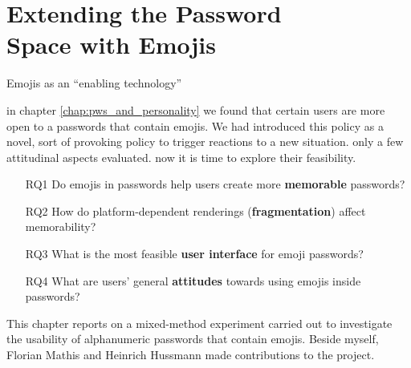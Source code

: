 \chapter[Extending the Password Space with Emojis]{Extending the Password \\ Space with Emojis}\label{chap:emojipasswords}


Emojis as an ``enabling technology''

in chapter \ref{chap:pws_and_personality} we found that certain users are more open to a passwords that contain emojis. We had introduced this policy as a novel, sort of provoking policy to trigger reactions to a new situation. only a few attitudinal aspects evaluated. now it is time to explore their feasibility. 


\begin{itemize}
	\item[RQ1] Do emojis in passwords help users create more \textbf{memorable} passwords?
	\item[RQ2] How do platform-dependent renderings (\textbf{fragmentation}) affect memorability?
	\item[RQ3] What is the most feasible \textbf{user interface} for emoji passwords?
	\item[RQ4] What are users' general \textbf{attitudes} towards using emojis inside passwords?
\end{itemize}

This chapter reports on a mixed-method experiment carried out to investigate the usability of alphanumeric passwords that contain emojis. Beside myself, Florian Mathis and Heinrich Hussmann made contributions to the project. 


